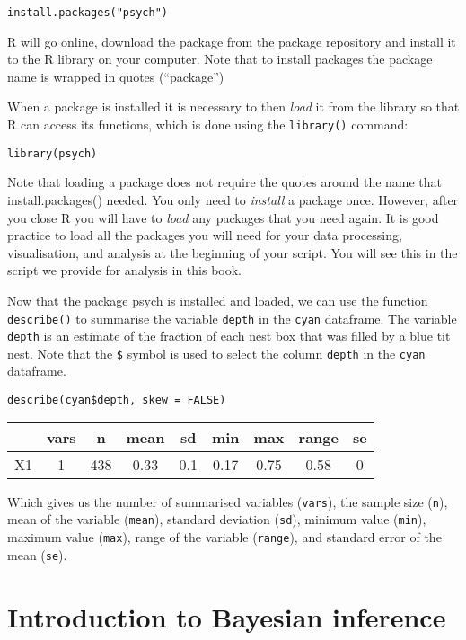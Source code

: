 \documentclass[
]{book}
\begin{document}
\texttt{install.packages("psych")}

R will go online, download the package from the package repository and
install it to the R library on your computer. Note that to install
packages the package name is wrapped in quotes (``package'')

When a package is installed it is necessary to then \emph{load} it from
the library so that R can access its functions, which is done using the
\texttt{library()} command:

\texttt{library(psych)}

Note that loading a package does not require the quotes around the name
that install.packages() needed. You only need to \emph{install} a
package once. However, after you close R you will have to \emph{load}
any packages that you need again. It is good practice to load all the
packages you will need for your data processing, visualisation, and
analysis at the beginning of your script. You will see this in the
script we provide for analysis in this book.

Now that the package psych is installed and loaded, we can use the
function \texttt{describe()} to summarise the variable \texttt{depth} in
the \texttt{cyan} dataframe. The variable \texttt{depth} is an estimate
of the fraction of each nest box that was filled by a blue tit nest.
Note that the \texttt{\$} symbol is used to select the column
\texttt{depth} in the \texttt{cyan} dataframe.

\texttt{describe(cyan\$depth,\ skew\ =\ FALSE)}

\begin{longtable}[]{@{}ccccccccc@{}}
\toprule
& vars & n & mean & sd & min & max & range & se \\
\midrule
\endhead
X1 & 1 & 438 & 0.33 & 0.1 & 0.17 & 0.75 & 0.58 & 0 \\
\bottomrule
\end{longtable}

Which gives us the number of summarised variables (\texttt{vars}), the
sample size (\texttt{n}), mean of the variable (\texttt{mean}), standard
deviation (\texttt{sd}), minimum value (\texttt{min}), maximum value
(\texttt{max}), range of the variable (\texttt{range}), and standard
error of the mean (\texttt{se}).

\hypertarget{introbayesian}{%
\chapter{Introduction to Bayesian inference}\label{introbayesian}}
\end{document}
